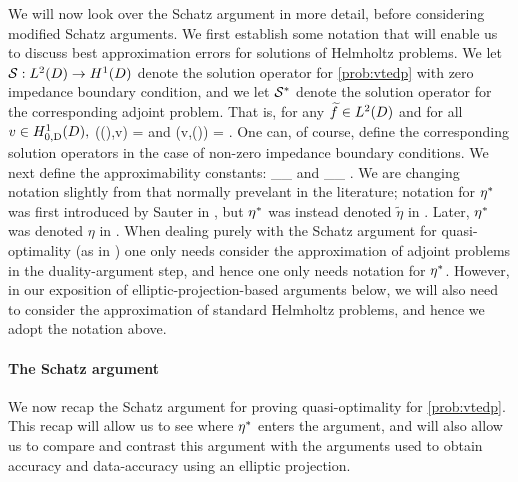 We will now look over the Schatz argument in more detail, before considering modified Schatz arguments. We first establish some notation that will enable us to discuss best approximation errors for solutions of Helmholtz problems. We let $\solfem:\LtD\rightarrow \HoD$ denote the solution operator for \cref{prob:vtedp} with zero impedance boundary condition, and we let $\mathcal S^{*}$ denote the solution operator for the corresponding adjoint problem. That is, for any $\ftilde \in \LtD$ and for all $v \in \HozDD,$
\beqs
\aT(\solfem(\ftilde),v) = 
\eeqs
and
\beqs
\aT(v,\solfems(\ftilde)) = .
\eeqs
One can, of course, define the corresponding solution operators in the case of non-zero impedance boundary conditions. We next define the approximability constants:
\beqs
\wba \de \sup_{\ftilde \in \LtD}\inf_{\vh \in \Vhp} \frac{\NHokD{\solfem(\ftilde) - \vh}}{\NLtD{\ftilde}}
\eeqs
and
\beqs
\wbaadj \de \sup_{\ftilde \in \LtD}\inf_{\vh \in \Vhp} \frac{\NHokD{\solfems(\ftilde) - \vh}}{\NLtD{\ftilde}}.
\eeqs
We are changing notation slightly from that normally prevelant in the literature; notation for $\eta^{*}$ was first introduced by Sauter in \cite[Section 2.2]{Sa:06}, but $\eta^{*}$ was instead denoted $\tilde{\eta}$ in \cite{Sa:06}. Later, $\eta^{*}$ was denoted $\eta$ in \cite[Equation (4.5)]{MeSa:10}.  When dealing purely with the Schatz argument for quasi-optimality (as in \cite[Section 2.2]{Sa:06}) one only needs consider the approximation of adjoint problems in the duality-argument step, and hence one only needs notation for $\eta^{*}$. However, in our exposition of elliptic-projection-based arguments below, we will also need to consider the approximation of standard Helmholtz problems, and hence we adopt the notation above.

\paragraph{The Schatz argument} We now recap the Schatz argument for proving quasi-optimality for \cref{prob:vtedp}. This recap will allow us to see where $\eta^{*}$ enters the argument, and will also allow us to compare and contrast this argument with the arguments used to obtain accuracy and data-accuracy using an elliptic projection.

